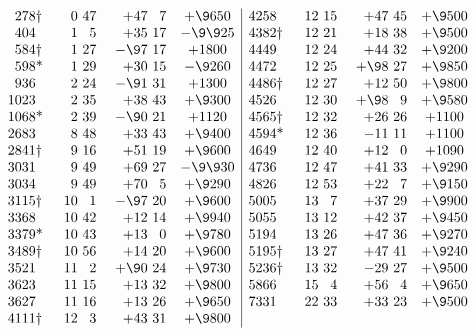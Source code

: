 \documentclass[12pt]{book}
\begin{document}
\begin{table}[hb]
\[\begin{array}{@{}r@{\qquad}r@{\ }r@{\quad\ }r@{\ }rc|r@{\qquad}r@{\ }r@{\quad\ }r@{\ }rc@{}}
  278\rlap{\dag} & 0 & 47 & +47 & 7 & +\9 650 & 4258 & 12 & 15 & +47 & 45 & +\9 500 \\
  404 & 1 & 5 & +35 & 17 & -\9\9 25 & 4382\rlap{\dag} & 12 & 21 & +18 & 38 & +\9 500 \\
  584\rlap{\dag} & 1 & 27 & -\9 7 & 17 & +1800 & 4449 & 12 & 24 & +44 & 32 & +\9 200 \\
  598\rlap{*} & 1 & 29 & +30 & 15 & -\9 260 & 4472 & 12 & 25 & +\9 8 & 27 & +\9 850 \\
  936 & 2 & 24 & -\9 1 & 31 & +1300 & 4486\rlap{\dag} & 12 & 27 & +12 & 50 & +\9 800 \\
  1023 & 2 & 35 & +38 & 43 & +\9 300 & 4526 & 12 & 30 & +\9 8 & 9 & +\9 580 \\
  1068\rlap{*} & 2 & 39 & -\9 0 & 21 & +1120 & 4565\rlap{\dag} & 12 & 32 & +26 & 26 & +1100 \\
  2683 & 8 & 48 & +33 & 43 & +\9 400 & 4594\rlap{*} & 12 & 36 & -11 & 11 & +1100 \\
  2841\rlap{\dag} & 9 & 16 & +51 & 19 & +\9 600 & 4649 & 12 & 40 & +12 & 0 & +1090 \\
  3031 & 9 & 49 & +69 & 27 & -\9\9 30 & 4736 & 12 & 47 & +41 & 33 & +\9 290 \\
  3034 & 9 & 49 & +70 & 5 & +\9 290 & 4826 & 12 & 53 & +22 & 7 & +\9 150 \\
  3115\rlap{\dag} & 10 & 1 & -\9 7 & 20 & +\9 600 & 5005 & 13 & 7 & +37 & 29 & +\9 900 \\
  3368 & 10 & 42 & +12 & 14 & +\9 940 & 5055 & 13 & 12 & +42 & 37 & +\9 450 \\
  3379\rlap{*} & 10 & 43 & +13 & 0 & +\9 780 & 5194 & 13 & 26 & +47 & 36 & +\9 270 \\
  3489\rlap{\dag} & 10 & 56 & +14 & 20 & +\9 600 & 5195\rlap{\dag} & 13 & 27 & +47 & 41 & +\9 240 \\
  3521 & 11 & 2 & +\9 0 & 24 & +\9 730 & 5236\rlap{\dag} & 13 & 32 & -29 & 27 & +\9 500 \\
  3623 & 11 & 15 & +13 & 32 & +\9 800 & 5866 & 15 & 4 & +56 & 4 & +\9 650 \\
  3627 & 11 & 16 & +13 & 26 & +\9 650 & 7331 & 22 & 33 & +33 & 23 & +\9 500 \\
  4111\rlap{\dag} & 12 & 3 & +43 & 31 & +\9 800 & \\
\end{array}
\]
\end{table}
\end{document}
